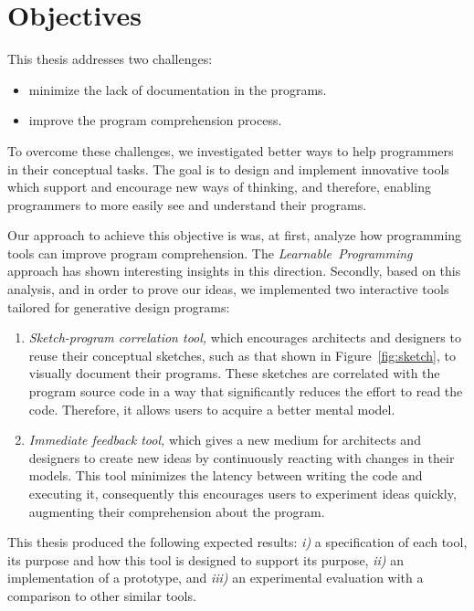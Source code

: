 \section{Objectives}

This thesis addresses two challenges:

\begin{itemize}
\item minimize the lack of documentation in the programs.
\item improve the program comprehension process.
\end{itemize}

To overcome these challenges, we investigated better ways to help programmers in their conceptual tasks. The goal is to design and implement innovative tools which support and encourage new ways of thinking, and therefore, enabling programmers to more easily see and understand their programs.

Our approach to achieve this objective is was, at first, analyze how programming tools can improve program comprehension. The \textit{Learnable~Programming}~\cite{learnableProg,inventingPrin} approach has shown interesting insights in this direction. Secondly, based on this analysis, and in order to prove our ideas, we implemented two interactive tools tailored for generative design programs: 

\begin{enumerate}
\item \textit{Sketch-program correlation tool,} which encourages architects and designers to reuse their conceptual sketches, such as that shown in Figure~\ref{fig:sketch}, to visually document their programs. These sketches are correlated with the program source code in a way that significantly reduces the effort to read the code. Therefore, it allows users to acquire a better mental model.

\item \textit{Immediate feedback tool,} which gives a new medium for architects and designers to create new ideas by continuously reacting with changes in their models. This tool minimizes the latency between writing the code and executing it, consequently this encourages users to experiment ideas quickly, augmenting their comprehension about the program.
\end{enumerate}

This thesis produced the following expected results: \textit{i)} a specification of each tool, its purpose and how this tool is designed to support its purpose, \textit{ii)} an implementation of a prototype, and \textit{iii)} an experimental evaluation with a comparison to other similar tools.